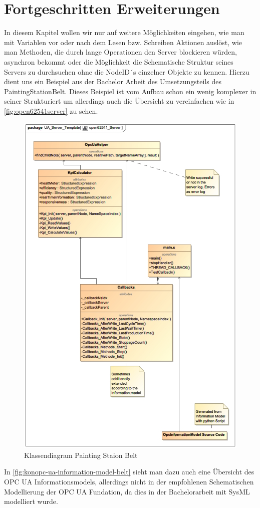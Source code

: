 \section{Fortgeschritten Erweiterungen}
In diesem Kapitel wollen wir nur auf weitere Möglichkeiten eingehen, wie man mit Variablen vor oder nach dem Lesen bzw. Schreiben Aktionen auslöst, wie man Methoden, die durch lange Operationen den Server blockieren würden, asynchron bekommt oder die Möglichkeit die Schematische Struktur seines Servers zu durchsuchen ohne die NodeID´s einzelner Objekte zu kennen. Hierzu dient uns ein Beispiel aus der Bachelor Arbeit des Umsetzungsteils des PaintingStationBelt.
Dieses Beispiel ist vom Aufbau schon ein wenig komplexer in seiner Strukturiert um allerdings auch die Übersicht zu vereinfachen wie in \autoref{fig:open62541server} zu sehen.
\begin{figure}[H]
	\centering
	\includegraphics[width=1\linewidth]{abb/open62541_Server}
	\caption{Klassendiagram Painting Staion Belt}
	\label{fig:open62541server}
\end{figure}
In \autoref{fig:konopc-ua-information-model-belt} sieht man dazu auch eine Übersicht des OPC UA Informationsmodels, allerdings nicht in der empfohlenen Schematischen Modellierung der OPC UA Fundation, da dies in der Bachelorarbeit mit SysML modelliert wurde.

